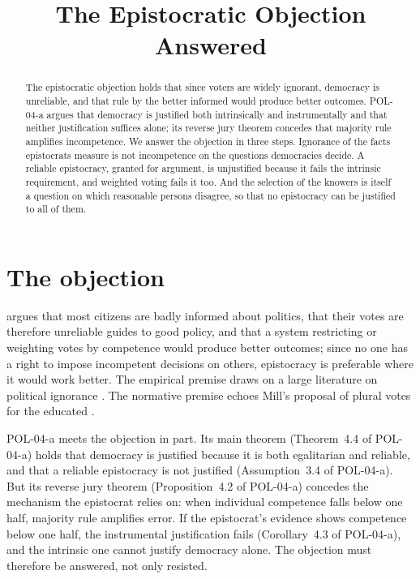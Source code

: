 \documentclass{situationist-preprint}
\title{The Epistocratic Objection Answered}
\begin{document}
\maketitle

\begin{abstract}
The epistocratic objection holds that since voters are widely ignorant, democracy is unreliable, and that rule by the better informed would produce better outcomes. POL-04-a argues that democracy is justified both intrinsically and instrumentally and that neither justification suffices alone; its reverse jury theorem concedes that majority rule amplifies incompetence. We answer the objection in three steps. Ignorance of the facts epistocrats measure is not incompetence on the questions democracies decide. A reliable epistocracy, granted for argument, is unjustified because it fails the intrinsic requirement, and weighted voting fails it too. And the selection of the knowers is itself a question on which reasonable persons disagree, so that no epistocracy can be justified to all of them.
\end{abstract}

\section{The objection}

\citet{Brennan2016} argues that most citizens are badly informed about politics, that their votes are therefore unreliable guides to good policy, and that a system restricting or weighting votes by competence would produce better outcomes; since no one has a right to impose incompetent decisions on others, epistocracy is preferable where it would work better. The empirical premise draws on a large literature on political ignorance \citep{Somin2013}. The normative premise echoes Mill's proposal of plural votes for the educated \citep[ch.~8]{Mill1861}.

POL-04-a meets the objection in part. Its main theorem (Theorem~4.4 of POL-04-a) holds that democracy is justified because it is both egalitarian and reliable, and that a reliable epistocracy is not justified (Assumption~3.4 of POL-04-a). But its reverse jury theorem (Proposition~4.2 of POL-04-a) concedes the mechanism the epistocrat relies on: when individual competence falls below one half, majority rule amplifies error. If the epistocrat's evidence shows competence below one half, the instrumental justification fails (Corollary~4.3 of POL-04-a), and the intrinsic one cannot justify democracy alone. The objection must therefore be answered, not only resisted.
\end{document}
